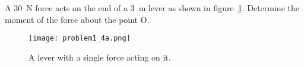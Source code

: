 A \SI{30}{\N} force acts on the end of a \SI{3}{\m} lever as shown in figure~\ref{A1:fig:Q4a}. Determine the moment of the force about the point O.
\begin{figure}
	\centering
	\texttt{[image: problem1\_4a.png]}
	\caption{A lever with a single force acting on it.}
	\label{A1:fig:Q4a}
\end{figure}